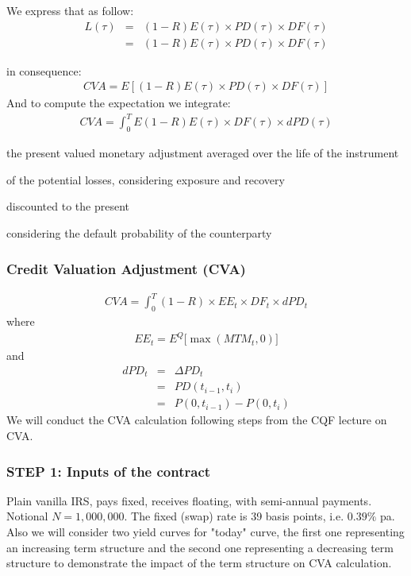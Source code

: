 \documentclass[11pt]{article}
\numberwithin{equation}{subsection}
\begin{document}
\noindent We express that as follow:
\begin{eqnarray*}
L(\tau)&=&(1-R)E(\tau) \times PD(\tau) \times DF(\tau)\\
&=&(1-R)E(\tau) \times PD(\tau) \times DF(\tau)
\end{eqnarray*}
	
\noindent in consequence:
\begin{eqnarray*}
CVA = E[(1-R)E(\tau) \times PD(\tau) \times DF(\tau)]
\end{eqnarray*}
And to compute the expectation we integrate:
\begin{eqnarray*}
CVA = \int_{0}^{T} E(1-R)E(\tau) \times DF(\tau) \times dPD(\tau)
\end{eqnarray*}


the present valued monetary adjustment
averaged over the life of the instrument

of the potential losses, considering exposure and recovery

discounted to the present 

considering the default probability of the counterparty

\subsubsection{Credit Valuation Adjustment (CVA)}

\begin{eqnarray*}
CVA = \int_{0}^{T} (1-R) \times EE_{t} \times DF_{t}  \times  dPD_{t}
\end{eqnarray*}
where 
\begin{eqnarray*}
EE_{t} = E^{Q} \big[\max(MTM_{t},0)\big]
\end{eqnarray*}
and 
\begin{eqnarray*}
dPD_{t}&=&\Delta PD_{t}\\
&=&PD(t_{i-1}, t_{i})\\
&=&P(0, t_{i-1}) - P(0, t_{i})
\end{eqnarray*}
We will conduct the CVA calculation following steps from the CQF lecture on CVA.

\subsubsection*{STEP 1: Inputs of the contract}
Plain vanilla IRS, pays fixed, receives floating, with semi-annual payments. Notional \(N = 1,000,000\). 
The fixed (swap) rate is 39 basis points, i.e. \(0.39\%\) pa. Also we will consider two yield curves for "today" curve, the first one representing an increasing term structure and the second one representing a decreasing term structure to demonstrate the impact of the term structure on CVA calculation.
\end{document}
